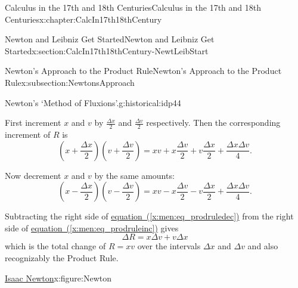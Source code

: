 \begin{chapterptx}{Calculus in the 17th and 18th Centuries}{}{Calculus in the 17th and 18th Centuries}{}{}{x:chapter:CalcIn17th18thCentury}
\begin{sectionptx}{Newton and Leibniz Get Started}{}{Newton and Leibniz Get Started}{}{}{x:section:CalcIn17th18thCentury-NewtLeibStart}
\begin{subsectionptx}{Newton's Approach to the Product Rule}{}{Newton's Approach to the Product Rule}{}{}{x:subsection:NewtonsApproach}
\begin{historical}{Newton's `Method of Fluxions'.}{g:historical:idp44}
			\end{historical}
			First increment \(x\) and \(v\) by \(\frac{\Delta x}{2}\) and \(\frac{\Delta v}{2}\) respectively. Then the corresponding increment of \(R\) is%
			\begin{equation}
				\left(x+\frac{\Delta x}{2}\right)\left(v+\frac{\Delta v}{2}\right) = xv + x\frac{\Delta v}{2} + v\frac{\Delta x}{2} +\frac{\Delta x\Delta v}{4}\text{.}\label{x:men:eq_prodruleinc}
			\end{equation}
			\par
			Now decrement \(x\) and \(v\) by the same amounts:%
			\begin{equation}
				\left(x-\frac{\Delta x}{2}\right)\left(v-\frac{\Delta v}{2}\right) = xv - x\frac{\Delta v}{2} - v\frac{\Delta x}{2} + \frac{\Delta x\Delta v}{4}\text{.}\label{x:men:eq_prodruledec}
			\end{equation}
			\par
			Subtracting the right side of \hyperref[x:men:eq_prodruledec]{equation~({\xreffont\ref{x:men:eq_prodruledec}})} from the right side of \hyperref[x:men:eq_prodruleinc]{equation~({\xreffont\ref{x:men:eq_prodruleinc}})} gives%
			\begin{equation*}
				\Delta R = x\Delta v + v\Delta x
			\end{equation*}
			which is the total change of \(R = xv\) over the intervals \(\Delta x\) and \(\Delta v\) and also recognizably the Product Rule.%
			\begin{figureptx}{\href{https://mathshistory.st-andrews.ac.uk/Biographies/Newton/}{Isaac Newton}\protect\footnotemark{}}{x:figure:Newton}{}%
				\begin{image}{0.325}{0.35}{0.325}%

\end{image}
\end{figureptx}
\end{subsectionptx}
\end{sectionptx}
\end{chapterptx}
